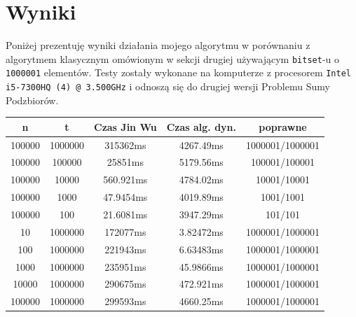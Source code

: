 \documentclass{article}
\begin{document}
\section{Wyniki}
Poniżej prezentuję wyniki działania mojego algorytmu w porównaniu z algorytmem klasycznym omówionym w sekcji drugiej
używającym \texttt{bitset}-u o \texttt{1000001} elementów.
Testy zostały wykonane na komputerze z procesorem \texttt{Intel i5-7300HQ (4) @ 3.500GHz} i odnoszą się do drugiej
wersji Problemu Sumy Podzbiorów.
\begin{center}
    \begin{tabular}{ |c|c|c|c|c| } 
    \hline
    n & t & Czas Jin Wu & Czas alg. dyn. & poprawne \\ 
    \hline
    100000 & 1000000 & 315362ms & 4267.49ms & 1000001/1000001 \\
    100000 & 100000 & 25851ms & 5179.56ms & 100001/100001 \\
    100000 & 10000 & 560.921ms & 4784.02ms & 10001/10001 \\
    100000 & 1000 & 47.9454ms & 4019.89ms & 1001/1001 \\
    100000 & 100 & 21.6081ms & 3947.29ms & 101/101 \\
    10 & 1000000 & 172077ms & 3.82472ms & 1000001/1000001 \\
    100 & 1000000 &221943ms & 6.63483ms & 1000001/1000001 \\
    1000 & 1000000 & 235951ms & 45.9866ms & 1000001/1000001 \\
    10000 & 1000000 & 290675ms & 472.921ms & 1000001/1000001 \\
    100000 & 1000000 & 299593ms & 4660.25ms & 1000001/1000001 \\
    \hline
    \end{tabular}
\end{center}


    


\end{document}
